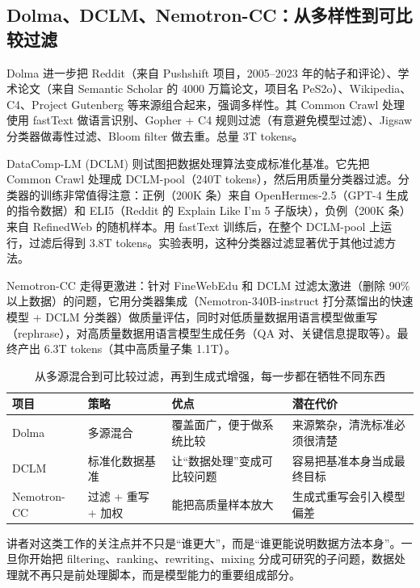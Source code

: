 \subsection{Dolma、DCLM、Nemotron-CC：从多样性到可比较过滤}

Dolma 进一步把 Reddit（来自 Pushshift 项目，2005--2023 年的帖子和评论）、学术论文（来自 Semantic Scholar 的 4000 万篇论文，项目名 PeS2o）、Wikipedia、C4、Project Gutenberg 等来源组合起来，强调多样性。其 Common Crawl 处理使用 fastText 做语言识别、Gopher + C4 规则过滤（有意避免模型过滤）、Jigsaw 分类器做毒性过滤、Bloom filter 做去重。总量 3T tokens。

DataComp-LM (DCLM) 则试图把数据处理算法变成标准化基准。它先把 Common Crawl 处理成 DCLM-pool（240T tokens），然后用质量分类器过滤。分类器的训练非常值得注意：正例（200K 条）来自 OpenHermes-2.5（GPT-4 生成的指令数据）和 ELI5（Reddit 的 Explain Like I'm 5 子版块），负例（200K 条）来自 RefinedWeb 的随机样本。用 fastText 训练后，在整个 DCLM-pool 上运行，过滤后得到 3.8T tokens。实验表明，这种分类器过滤显著优于其他过滤方法。

Nemotron-CC 走得更激进：针对 FineWebEdu 和 DCLM 过滤太激进（删除 90\% 以上数据）的问题，它用分类器集成（Nemotron-340B-instruct 打分蒸馏出的快速模型 + DCLM 分类器）做质量评估，同时对低质量数据用语言模型做重写（rephrase），对高质量数据用语言模型生成任务（QA 对、关键信息提取等）。最终产出 6.3T tokens（其中高质量子集 1.1T）。

\begin{table}[H]
\centering
\begin{tabular}{p{}p{}p{}p{}}
\toprule
\textbf{项目} & \textbf{策略} & \textbf{优点} & \textbf{潜在代价} \\
\midrule
Dolma & 多源混合 & 覆盖面广，便于做系统比较 & 来源繁杂，清洗标准必须很清楚 \\
DCLM & 标准化数据基准 & 让“数据处理”变成可比较问题 & 容易把基准本身当成最终目标 \\
Nemotron-CC & 过滤 + 重写 + 加权 & 能把高质量样本放大 & 生成式重写会引入模型偏差 \\
\bottomrule
\end{tabular}
\caption{从多源混合到可比较过滤，再到生成式增强，每一步都在牺牲不同东西}
\end{table}

讲者对这类工作的关注点并不只是“谁更大”，而是“谁更能说明数据方法本身”。一旦你开始把 filtering、ranking、rewriting、mixing 分成可研究的子问题，数据处理就不再只是前处理脚本，而是模型能力的重要组成部分。

